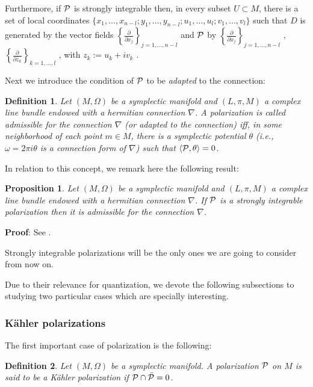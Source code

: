 \documentclass[12pt]{article}
\newtheorem{prop}{Proposition}
\newtheorem{definition}{Definition}
\def\dst{\(}
\def\derpar#1#2{\frac{\partial{#1}}{\partial{#2}}}
\def\qed{\ifvmode\removelastskip\fi
{\unskip\nobreak\hfil\penalty50\hbox{}\nobreak\hfil
\hbox{\vrule height1.2ex width1.2ex}\parfillskip=0pt
\finalhyphendemerits=0 \par\smallskip}}
\def\P{{\cal P}}
\begin{document}
Furthermore, if $\P$ is strongly integrable then,
in every subset $U \subset M$,
there is a set of local coordinates
$\{ x_1, \ldots ,x_{n-l};y_1,\ldots ,y_{n-l};
u_1,\ldots ,u_l;v_1,\ldots ,v_l \}$
such that $D$ is generated by the vector fields
\dst\left\{ \derpar{}{x_j} \right\}_{j=1,\ldots ,n-l}\)
and $\P$ by  \dst\left\{ \derpar{}{x_j} \right\}_{j=1,\ldots ,n-l}\) ,
\dst\left\{ \derpar{}{\bar z_k} \right\}_{k=1,\ldots ,l}\) ,
with $z_k := u_k + i v_k$ \cite{Ki-76}.

Next we introduce the condition of $\P$ to be {\it adapted} to the
connection:

\begin{definition}
Let $(M,\Omega )$ be a symplectic manifold and $(L,\pi ,M)$ a
complex line bundle endowed with a hermitian connection $\nabla$.
A polarization is called {\rm admissible} for the connection
$\nabla$ (or {\rm adapted} to the connection) iff, in some
neighborhood of each point $m \in M$, there is a symplectic
potential $\theta$ (i.e., $\omega = 2\pi i \theta$ is a connection
form of $\nabla$) such that $\langle \P ,\theta \rangle = 0$.
\end{definition}

In relation to this concept, we remark here the following result:

\begin{prop}
Let $(M,\Omega )$ be a symplectic manifold
and $(L,\pi ,M)$ a complex line bundle
endowed with a hermitian connection $\nabla$.
If $\P$ is a strongly integrable polarization
then it is admissible for the connection $\nabla$.
\end{prop}
{\bf Proof}: 
See \cite{Ra-77}.
\qed

Strongly integrable polarizations
will be the only ones
we are going to consider from now on.

Due to their relevance for quantization,
we devote the following subsections to studying
two particular cases which are specially interesting.


\subsubsection{K\"ahler polarizations}
\protect \label{Kpol}


The first important case of polarization is the following:

\begin{definition}
Let $(M,\Omega )$ be a symplectic manifold.
A polarization $\P$ on $M$ is said to be a
{\rm K\"ahler polarization} if $\P \cap \bar \P = 0$.
\end{definition}
\end{document}
